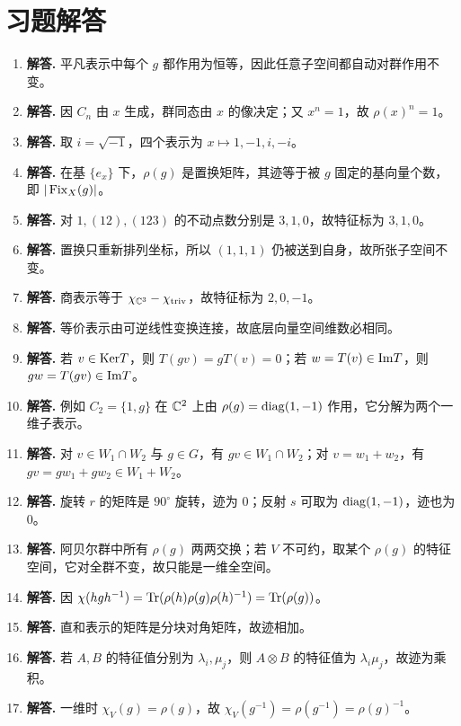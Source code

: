 \section*{习题解答}
\begin{enumerate}[label=\textbf{\arabic*.}, leftmargin=*, itemsep=1em]
\item \textbf{解答.} 平凡表示中每个 $g$ 都作用为恒等，因此任意子空间都自动对群作用不变。
\item \textbf{解答.} 因 $C_n$ 由 $x$ 生成，群同态由 $x$ 的像决定；又 $x^n=1$，故 $\rho(x)^n=1$。
\item \textbf{解答.} 取 $i=\sqrt{-1}$，四个表示为 $x\mapsto 1,-1,i,-i$。
\item \textbf{解答.} 在基 $\{e_x\}$ 下，$\rho(g)$ 是置换矩阵，其迹等于被 $g$ 固定的基向量个数，即 $|\operatorname{Fix}_X(g)|$。
\item \textbf{解答.} 对 $1,(12),(123)$ 的不动点数分别是 $3,1,0$，故特征标为 $3,1,0$。
\item \textbf{解答.} 置换只重新排列坐标，所以 $(1,1,1)$ 仍被送到自身，故所张子空间不变。
\item \textbf{解答.} 商表示等于 $\chi_{\mathbb{C}^3}-\chi_{\mathrm{triv}}$，故特征标为 $2,0,-1$。
\item \textbf{解答.} 等价表示由可逆线性变换连接，故底层向量空间维数必相同。
\item \textbf{解答.} 若 $v\in\mathrm{Ker} T$，则 $T(gv)=gT(v)=0$；若 $w=T(v)\in\mathrm{Im} T$，则 $gw=T(gv)\in\mathrm{Im} T$。
\item \textbf{解答.} 例如 $C_2=\{1,g\}$ 在 $\mathbb{C}^2$ 上由 $\rho(g)=\mathrm{diag}(1,-1)$ 作用，它分解为两个一维子表示。
\item \textbf{解答.} 对 $v\in W_1\cap W_2$ 与 $g\in G$，有 $gv\in W_1\cap W_2$；对 $v=w_1+w_2$，有 $gv=gw_1+gw_2\in W_1+W_2$。
\item \textbf{解答.} 旋转 $r$ 的矩阵是 $90^\circ$ 旋转，迹为 $0$；反射 $s$ 可取为 $\mathrm{diag}(1,-1)$，迹也为 $0$。
\item \textbf{解答.} 阿贝尔群中所有 $\rho(g)$ 两两交换；若 $V$ 不可约，取某个 $\rho(g)$ 的特征空间，它对全群不变，故只能是一维全空间。
\item \textbf{解答.} 因 $\chi(hgh^{-1})=\mathrm{Tr}(\rho(h)\rho(g)\rho(h)^{-1})=\mathrm{Tr}(\rho(g))$。
\item \textbf{解答.} 直和表示的矩阵是分块对角矩阵，故迹相加。
\item \textbf{解答.} 若 $A,B$ 的特征值分别为 $\lambda_i,\mu_j$，则 $A\otimes B$ 的特征值为 $\lambda_i\mu_j$，故迹为乘积。
\item \textbf{解答.} 一维时 $\chi_V(g)=\rho(g)$，故 $\chi_V(g^{-1})=\rho(g^{-1})=\rho(g)^{-1}$。

\end{enumerate}
